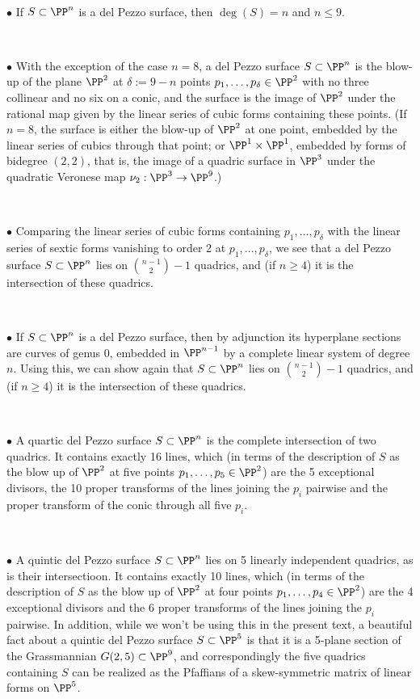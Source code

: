 \

$\bullet$ If $S \subset \PP^n$ is a del Pezzo surface, then $\deg(S) = n$ and $n \leq 9$.

\

$\bullet$ With the exception of the case $n=8$, a del Pezzo surface $S \subset \PP^n$ is the blow-up of the plane $\PP^2$ at $\delta := 9-n$ points $p_1,\dots,p_\delta \in \PP^2$ with no three collinear and no six on a conic, 
and the surface is the image of $\PP^2$ under the rational map given by  the linear series  of cubic forms containing these points. (If $n=8$, the surface
is either the blow-up of $\PP^2$  at one point, embedded by the linear series of cubics through that point; or $\PP^1 \times \PP^1$, embedded by forms of bidegree $(2,2)$, that is,  the image of a quadric surface in $\PP^3$ under the quadratic Veronese map $\nu_2 : \PP^3 \to \PP^9$.) 

\

$\bullet$ Comparing the linear series  of cubic forms containing $p_1,\dots,p_\delta$ with the linear series  of sextic forms vanishing to order 2 at $p_1,\dots,p_\delta$, we see that a del Pezzo surface $S \subset \PP^n$ lies on $\binom{n-1}{2} - 1$ quadrics, and (if $n \geq 4$) it is the intersection of these quadrics.

\

$\bullet$ If $S \subset \PP^n$ is a del Pezzo surface, then by adjunction its hyperplane sections are curves of genus 0, embedded in $\PP^{n-1}$ by a complete linear system of degree $n$. Using this, we can show again that $S \subset \PP^n$ lies on $\binom{n-1}{2} - 1$ quadrics, and (if $n \geq 4$) it is the intersection of these quadrics.

\

$\bullet$ A quartic del Pezzo surface $S \subset \PP^n$ is the complete intersection of two quadrics. It contains exactly 16 lines, which (in terms of the description of $S$ as the blow up of $\PP^2$ at five points $p_1,\dots,p_5 \in \PP^2$) are the 5 exceptional divisors, the 10 proper transforms of the lines joining the $p_i$ pairwise and the proper transform of the conic through all five $p_i$.


\

$\bullet$ A quintic del Pezzo surface $S \subset \PP^n$ lies on 5 linearly independent quadrics, as is their intersectioon. It contains exactly 10 lines, which (in terms of the description of $S$ as the blow up of $\PP^2$ at four points $p_1,\dots,p_4 \in \PP^2$) are the 4 exceptional divisors and the 6 proper transforms of the lines joining the $p_i$ pairwise. In addition, while we won't be using this in the present text, a beautiful fact about a  quintic del Pezzo surface $S \subset \PP^5$  is that it is a 5-plane section of the Grassmannian $G(2,5) \subset \PP^9$, and correspondingly the five quadrics containing $S$ can be realized as the Pfaffians of a  skew-symmetric matrix of linear forms on $\PP^5$.

